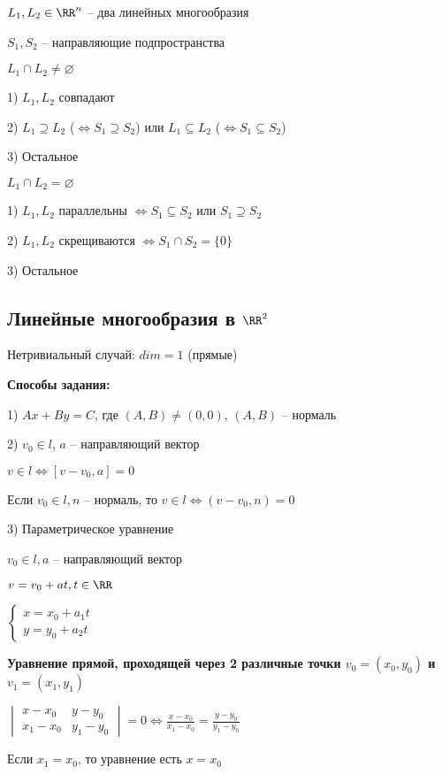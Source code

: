 $L_1, L_2 \in \RR^n$ -- два линейных многообразия

$S_1, S_2$ -- направляющие подпространства

\bigskip
$L_1 \cap L_2 \neq \varnothing$

1) $L_1, L_2$ совпадают

2) $L_1 \supseteq L_2$ ($\Leftrightarrow S_1 \supseteq S_2$) или $L_1 \subseteq L_2$ ($\Leftrightarrow S_1 \subseteq S_2$)

3) Остальное

\bigskip
$L_1 \cap L_2 = \varnothing$

1) $L_1, L_2$ параллельны $\Leftrightarrow S_1 \subseteq S_2$ или $S_1 \supseteq S_2$

2) $L_1, L_2$ скрещиваются $\Leftrightarrow S_1 \cap S_2 = \{0\}$

3) Остальное

\subsection{Линейные многообразия в $\RR^2$}

Нетривиальный случай: $dim = 1$ (прямые)

\textbf{Способы задания:}

1) $Ax + By = C$, где $(A, B) \neq (0, 0)$, $(A, B)$ -- нормаль

2) $v_0 \in l$, $a$ -- направляющий вектор

$v \in l \Leftrightarrow [v - v_0, a] = 0$

Если $v_0 \in l, n$ -- нормаль, то $v \in l \Leftrightarrow (v - v_0, n) = 0$

3) Параметрическое уравнение

$v_0 \in l, a$ -- направляющий вектор

$v = v_0 + at, t \in \RR$

$\begin{cases} x = x_0 + a_1 t \\ y = y_0 + a_2 t \end{cases}$

\bigskip
\textbf{Уравнение прямой, проходящей через 2 различные точки $v_0 = (x_0, y_0)$ и $v_1 = (x_1, y_1)$}

$\begin{vmatrix} x - x_0 & y - y_0 \\ x_1 - x_0 & y_1 - y_0 \end{vmatrix} = 0 \Leftrightarrow \frac{x - x_0}{x_1 - x_0} = \frac{y - y_0}{y_1 - y_0}$

\bigskip
Если $x_1 = x_0$, то уравнение есть $x = x_0$

